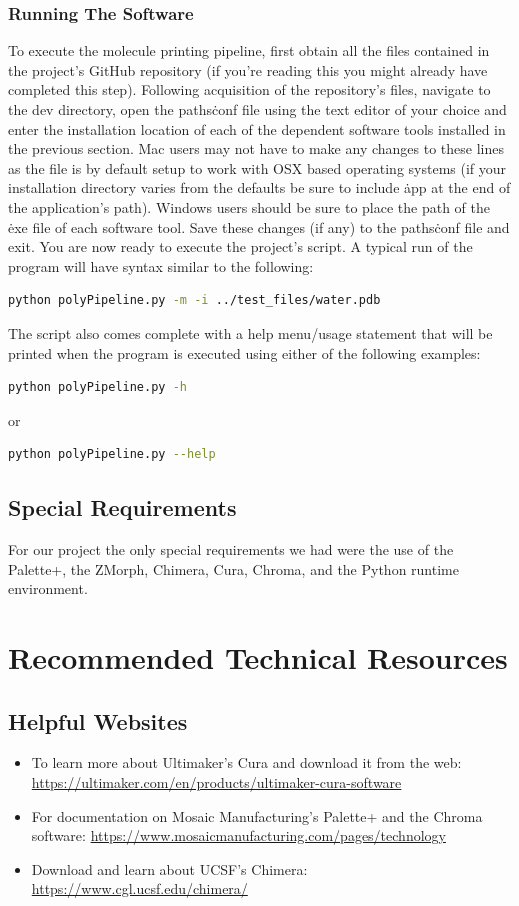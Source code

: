 \documentclass[letterpaper, onecolumn, draftclsnofoot, 10pt, compsoc]{IEEEtran}
\begin{document}
\begin{singlespace}
\subsubsection{Running The Software}
To execute the molecule printing pipeline, first obtain all the files contained in the project's GitHub repository (if you're reading this you might already have completed this step). Following acquisition of the repository's files, navigate to the dev\/ directory, open the paths\.conf file using the text editor of your choice and enter the installation location of each of the dependent software tools installed in the previous section. Mac users may not have to make any changes to these lines as the file is by default setup to work with OSX based operating systems (if your installation directory varies from the defaults be sure to include \.app at the end of the application's path). Windows users should be sure to place the path of the \.exe file of each software tool. Save these changes (if any) to the paths\.conf file and exit. You are now ready to execute the project's script. A typical run of the program will have syntax similar to the following: 
\begin{lstlisting}[language=bash]
python polyPipeline.py -m -i ../test_files/water.pdb
\end{lstlisting}
The script also comes complete with a help menu/usage statement that will be printed when the program is executed using either of the following examples: 
\begin{lstlisting}[language=bash]
python polyPipeline.py -h
\end{lstlisting}
or
\begin{lstlisting}[language=bash]
python polyPipeline.py --help
\end{lstlisting}

\subsection{Special Requirements}
For our project the only special requirements we had were the use of the Palette+, the ZMorph, Chimera, Cura, Chroma, and the Python runtime environment.

\section{Recommended Technical Resources} %
\subsection{Helpful Websites}
\begin{itemize}
\item To learn more about Ultimaker's Cura and download it from the web: \url{https://ultimaker.com/en/products/ultimaker-cura-software}
\item For documentation on Mosaic Manufacturing's Palette+ and the Chroma software: \url{https://www.mosaicmanufacturing.com/pages/technology}
\item Download and learn about UCSF's Chimera: \url{https://www.cgl.ucsf.edu/chimera/}
\end{itemize}

\end{singlespace}
\end{document}

